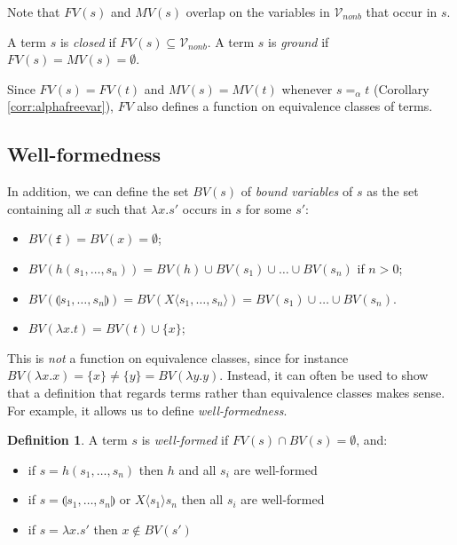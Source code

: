 \documentclass{lmcs}
\theoremstyle{theorem}\newtheorem{theorem}{Theorem}
\theoremstyle{theorem}\newtheorem{lemma}[theorem]{Lemma}
\theoremstyle{theorem}\newtheorem{corollary}[theorem]{Corollary}
\theoremstyle{definition}\newtheorem{definition}[theorem]{Definition}
\theoremstyle{definition}\newtheorem{example}[theorem]{Example}
\newcommand{\Vfree}{\mathcal{V}_{\mathit{nonb}}}
\newcommand{\FV}{\mathit{FV}}
\newcommand{\FMV}{\mathit{MV}}
\newcommand{\BV}{\mathit{BV}}
\newcommand{\identifier}[1]{\mathtt{#1}}
\newcommand{\afun}{\identifier{f}}
\newcommand{\avar}{x}
\newcommand{\bvar}{y}
\newcommand{\Avar}{X}
\newcommand{\abs}[2]{\lambda #1.#2}
\newcommand{\meta}[2]{#1\langle#2\rangle}
\newcommand{\tuple}[2]{\llparenthesis #1,\dots,#2 \rrparenthesis}
\begin{document}
Note that $\FV(s)$ and $\FMV(s)$ overlap on the variables in $\Vfree$ that occur
in $s$.

A term $s$ is \emph{closed} if $\FV(s) \subseteq \Vfree$.
A term $s$ is \emph{ground} if $\FV(s) = \FMV(s) = \emptyset$.

Since $\FV(s) = \FV(t)$ and $\FMV(s) = \FMV(t)$ whenever $s =_\alpha t$
(Corollary \ref{corr:alphafreevar}), $\FV$ also defines a function on
equivalence classes of terms.

\subsection{Well-formedness}

In addition, we can define the set $\BV(s)$ of \emph{bound variables} of $s$ as
the set containing all $\avar$ such that $\abs{\avar}{s'}$ occurs in $s$ for
some $s'$:

\begin{itemize}
\item $\BV(\afun) = \BV(\avar) = \emptyset$;
\item $\BV(h(s_1,\dots,s_n)) = \BV(h) \cup \BV(s_1) \cup \dots \cup \BV(s_n)$ if
  $n > 0$;
\item $\BV(\tuple{s_1}{s_n}) = \BV(\meta{\Avar}{s_1,\dots,s_n}) =
  \BV(s_1) \cup \dots \cup \BV(s_n)$.
\item $\BV(\abs{\avar}{t}) = \BV(t) \cup \{ \avar \}$;
\end{itemize}

This is \emph{not} a function on equivalence classes, since for
instance $\BV(\abs{\avar}{\avar}) = \{\avar\} \neq \{\bvar\} = \BV(\abs{\bvar}{
\bvar})$.  Instead, it can often be used to show that a definition that regards
terms rather than equivalence classes makes sense.  For example, it allows us to
define \emph{well-formedness}.

\begin{definition}\label{def:wellformed}
A term $s$ is \emph{well-formed} if $\FV(s) \cap \BV(s) = \emptyset$, and:
\begin{itemize}
\item if $s = h(s_1,\dots,s_n)$ then $h$ and all $s_i$ are well-formed
\item if $s = \tuple{s_1}{s_n}$ or $\meta{\Avar}{s_1}{s_n}$ then all $s_i$ are
  well-formed
\item if $s = \abs{\avar}{s'}$ then $\avar \notin \BV(s')$
\end{itemize}
\end{definition}
\end{document}
